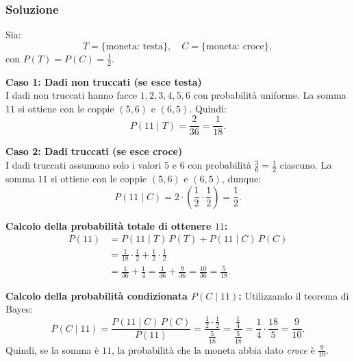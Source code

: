 \subsubsection{Soluzione}

Sia:
\[
T = \{\text{moneta: testa}\}, \quad C = \{\text{moneta: croce}\},
\]
con \(P(T)=P(C)=\frac{1}{2}\).

\textbf{Caso 1: Dadi non truccati (se esce testa)}\\[1mm]
I dadi non truccati hanno facce \(1,2,3,4,5,6\) con probabilità uniforme. La somma \(11\) si ottiene con le coppie \((5,6)\) e \((6,5)\). Quindi:
\[
P(11 \mid T) = \frac{2}{36} = \frac{1}{18}.
\]

\textbf{Caso 2: Dadi truccati (se esce croce)}\\[1mm]
I dadi truccati assumono solo i valori \(5\) e \(6\) con probabilità \( \frac{3}{6} = \frac{1}{2}\) ciascuno. La somma \(11\) si ottiene con le coppie \((5,6)\) e \((6,5)\), dunque:
\[
P(11 \mid C) = 2 \cdot \left(\frac{1}{2} \cdot \frac{1}{2}\right) = \frac{1}{2}.
\]

\textbf{Calcolo della probabilità totale di ottenere \(11\):}
\[
\begin{split}
P(11) &= P(11 \mid T) \, P(T) + P(11 \mid C) \, P(C) \\
&= \frac{1}{18} \cdot \frac{1}{2} + \frac{1}{2} \cdot \frac{1}{2} \\
&= \frac{1}{36} + \frac{1}{4} = \frac{1}{36} + \frac{9}{36} = \frac{10}{36} = \frac{5}{18}.
\end{split}
\]

\textbf{Calcolo della probabilità condizionata \(P(C \mid 11)\):}
Utilizzando il teorema di Bayes:
\[
P(C \mid 11) = \frac{P(11 \mid C) \, P(C)}{P(11)} 
= \frac{\frac{1}{2} \cdot \frac{1}{2}}{\frac{5}{18}} 
= \frac{\frac{1}{4}}{\frac{5}{18}} 
= \frac{1}{4} \cdot \frac{18}{5} 
= \frac{9}{10}.
\]
Quindi, se la somma è \(11\), la probabilità che la moneta abbia dato \emph{croce} è \(\frac{9}{10}\).

